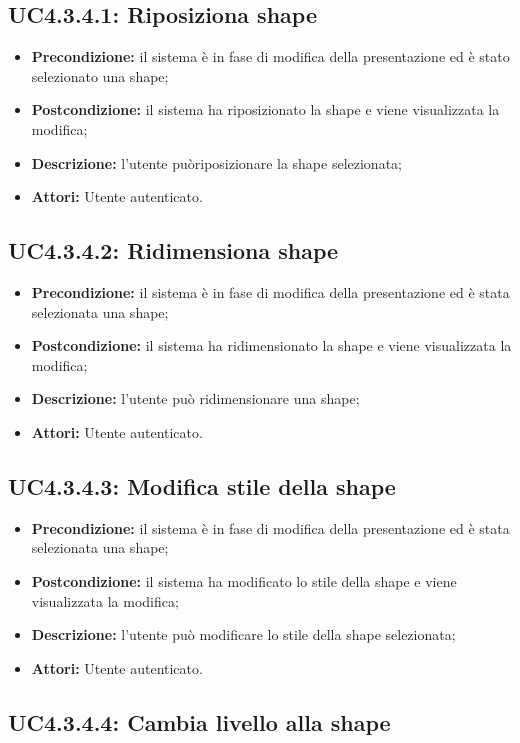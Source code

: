 \subsection{ UC4.3.4.1: Riposiziona shape}

\begin{itemize}
	\item \textbf{Precondizione:} 	il sistema è in fase di modifica della presentazione ed è stato selezionato una shape;
	\item \textbf{Postcondizione:} il sistema ha riposizionato la shape e viene visualizzata la modifica;
	\item \textbf{Descrizione:} l'utente puòriposizionare la shape selezionata;
	\item \textbf{Attori:} Utente autenticato.
\end{itemize}
\subsection{ UC4.3.4.2: Ridimensiona shape}

\begin{itemize}
	\item \textbf{Precondizione:} il sistema è in fase di modifica della presentazione ed è stata selezionata una shape;
	\item \textbf{Postcondizione:} il sistema ha ridimensionato la shape e viene visualizzata la modifica;
	\item \textbf{Descrizione:} l'utente può ridimensionare una shape;
	\item \textbf{Attori:} Utente autenticato.
\end{itemize}
\subsection{ UC4.3.4.3: Modifica stile della shape}

\begin{itemize}
	\item \textbf{Precondizione:} il sistema è in fase di modifica della presentazione ed è stata selezionata una shape;
	\item \textbf{Postcondizione:} il sistema ha modificato lo stile della shape e viene visualizzata la modifica;
	\item \textbf{Descrizione:} l'utente può modificare lo stile della shape selezionata;
	\item \textbf{Attori:} Utente autenticato.
\end{itemize}
\subsection{ UC4.3.4.4: Cambia livello alla shape}

